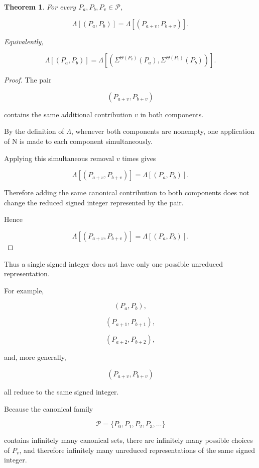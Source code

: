\documentclass[12pt]{article}
\newtheorem{theorem}{Theorem}
\newcommand{\Nu}{\mathrm{N}}
\begin{document}
\begin{theorem}

For every \(P_a,P_b,P_v\in\mathcal P\),

\[
\boxed{
\Lambda[(P_a,P_b)]
=
\Lambda[(P_{a+v},P_{b+v})].
}
\]

Equivalently,

\[
\boxed{
\Lambda[(P_a,P_b)]
=
\Lambda\left[
\left(
\Sigma^{\Theta(P_v)}(P_a),
\Sigma^{\Theta(P_v)}(P_b)
\right)
\right].
}
\]

\end{theorem}

\begin{proof}

The pair

\[
(P_{a+v},P_{b+v})
\]

contains the same additional contribution \(v\) in both components.

By the definition of \(\Lambda\), whenever both components are nonempty, one application of \(\Nu\) is made to each component simultaneously.

Applying this simultaneous removal \(v\) times gives

\[
\Lambda[(P_{a+v},P_{b+v})]
=
\Lambda[(P_a,P_b)].
\]

Therefore adding the same canonical contribution to both components does not change the reduced signed integer represented by the pair.

Hence

\[
\boxed{
\Lambda[(P_{a+v},P_{b+v})]
=
\Lambda[(P_a,P_b)].
}
\]

\end{proof}

Thus a single signed integer does not have only one possible unreduced representation.

For example,

\[
(P_a,P_b),
\]

\[
(P_{a+1},P_{b+1}),
\]

\[
(P_{a+2},P_{b+2}),
\]

and, more generally,

\[
(P_{a+v},P_{b+v})
\]

all reduce to the same signed integer.

Because the canonical family

\[
\mathcal P
=
\{P_0,P_1,P_2,P_3,\ldots\}
\]

contains infinitely many canonical sets, there are infinitely many possible choices of \(P_v\), and therefore infinitely many unreduced representations of the same signed integer.
\end{document}
